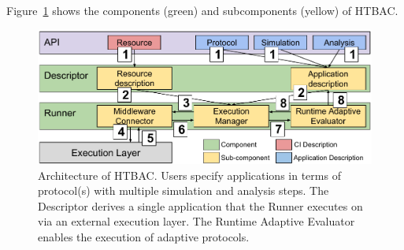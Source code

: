 








Figure~\ref{fig:architecture} shows the components (green) and subcomponents
(yellow) of HTBAC.

\begin{figure}
  \centering
  \includegraphics[width=\columnwidth]{figures/HTBAC_architecture_model.pdf}
  \caption{Architecture of HTBAC. Users specify applications in terms of
  protocol(s) with multiple simulation and analysis steps. The Descriptor
  derives a single application that the Runner executes on via an external
  execution layer. The Runtime Adaptive Evaluator enables the execution of
  adaptive protocols.}
\label{fig:architecture}
\end{figure}

